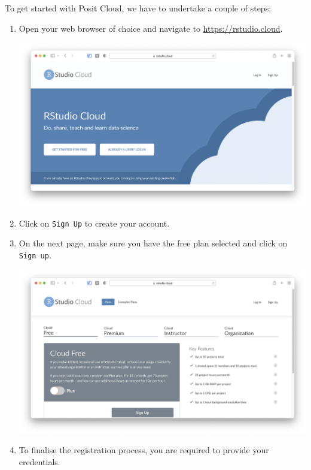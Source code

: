 \documentclass[
  letterpaper,
]{krantz}
\begin{document}
To get started with Posit Cloud, we have to undertake a couple of steps:

\begin{enumerate}
\def\labelenumi{\arabic{enumi}.}
\item
  Open your web browser of choice and navigate to
  \url{https://rstudio.cloud}.

  \includegraphics{images/chapter_03_img/rstudio_cloud/01_rstudio_cloud.png}
\item
  Click on \texttt{Sign\ Up} to create your account.
\item
  On the next page, make sure you have the free plan selected and click
  on \texttt{Sign\ up}.

  \includegraphics{images/chapter_03_img/rstudio_cloud/02_rstudio_cloud.png}
\item
  To finalise the registration process, you are required to provide your
  credentials.


\end{enumerate}
\end{document}

